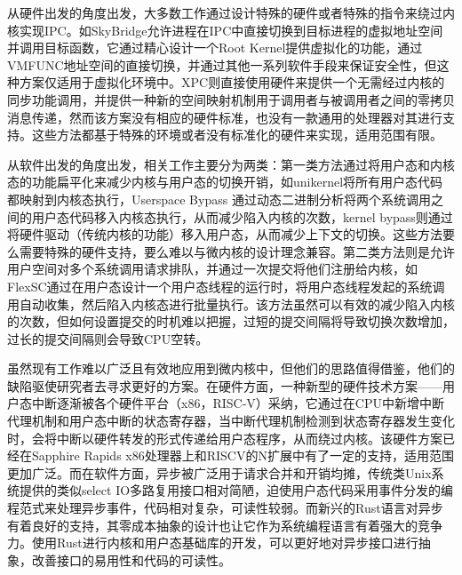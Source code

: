 从硬件出发的角度出发，大多数工作通过设计特殊的硬件或者特殊的指令来绕过内核实现IPC。如SkyBridge\cite{mi2019skybridge}允许进程在IPC中直接切换到目标进程的虚拟地址空间并调用目标函数，它通过精心设计一个Root Kernel提供虚拟化的功能，通过VMFUNC地址空间的直接切换\cite{li2015reducing}，并通过其他一系列软件手段来保证安全性，但这种方案仅适用于虚拟化环境中。XPC\cite{du2019xpc}则直接使用硬件来提供一个无需经过内核的同步功能调用，并提供一种新的空间映射机制用于调用者与被调用者之间的零拷贝消息传递，然而该方案没有相应的硬件标准，也没有一款通用的处理器对其进行支持。这些方法都基于特殊的环境或者没有标准化的硬件来实现，适用范围有限。

从软件出发的角度出发，相关工作主要分为两类：第一类方法通过将用户态和内核态的功能扁平化来减少内核与用户态的切换开销，如unikernel\cite{kuo2020linux, olivier2019binary, yu2017web}将所有用户态代码都映射到内核态执行，Userspace Bypass\cite{zhou2023userspace} 通过动态二进制分析将两个系统调用之间的用户态代码移入内核态执行，从而减少陷入内核的次数，kernel bypass\cite{jeong2014mtcp, yang2017spdk}则通过将硬件驱动（传统内核的功能）移入用户态，从而减少上下文的切换。这些方法要么需要特殊的硬件支持，要么难以与微内核的设计理念兼容。第二类方法则是允许用户空间对多个系统调用请求排队，并通过一次提交将他们注册给内核，如FlexSC\cite{soares2010flexsc}通过在用户态设计一个用户态线程的运行时，将用户态线程发起的系统调用自动收集，然后陷入内核态进行批量执行。该方法虽然可以有效的减少陷入内核的次数，但如何设置提交的时机难以把握，过短的提交间隔将导致切换次数增加，过长的提交间隔则会导致CPU空转。

虽然现有工作难以广泛且有效地应用到微内核中，但他们的思路值得借鉴，他们的缺陷驱使研究者去寻求更好的方案。在硬件方面，一种新型的硬件技术方案——用户态中断\cite{nassif2022sapphire, RISCVPrivileged2020}逐渐被各个硬件平台（x86，RISC-V）采纳，它通过在CPU中新增中断代理机制和用户态中断的状态寄存器，当中断代理机制检测到状态寄存器发生变化时，会将中断以硬件转发的形式传递给用户态程序，从而绕过内核。该硬件方案已经在Sapphire Rapids x86处理器上和RISCV的N扩展中有了一定的支持，适用范围更加广泛。而在软件方面，异步被广泛用于请求合并和开销均摊，传统类Unix系统提供的类似select IO多路复用接口相对简陋，迫使用户态代码采用事件分发的编程范式来处理异步事件，代码相对复杂，可读性较弱。而新兴的Rust\cite{levy2015ownership, balasubramanian2017system}语言对异步有着良好的支持，其零成本抽象的设计也让它作为系统编程语言有着强大的竞争力。使用Rust进行内核和用户态基础库的开发，可以更好地对异步接口进行抽象，改善接口的易用性和代码的可读性。

